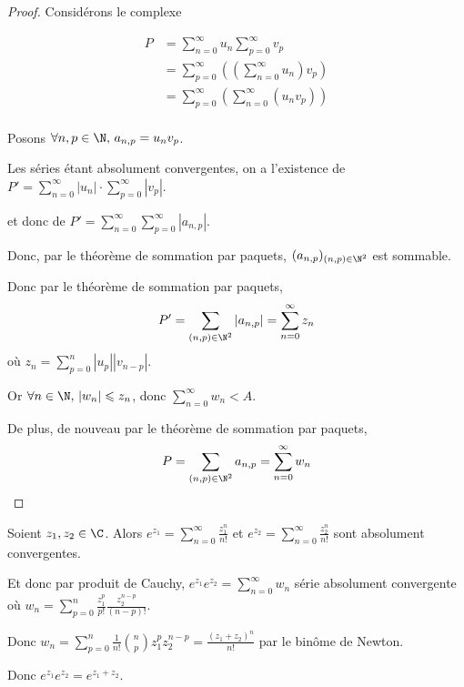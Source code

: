 
\begin{proof}
    Considérons le complexe 

    \begin{align*}
        P & = \sum_{n = 0 }^{\infty } u_n \sum_{p = 0 }^{\infty } v_p \\
            & = \sum_{p = 0 }^{\infty } \left( \left( \sum_{n = 0}^{\infty } u_n \right) v_p \right) \\
            & = \sum_{p = 0 }^{\infty } \left( \sum_{n = 0}^{\infty } (u_n v_p) \right) \\ 
    \end{align*}

    Posons $\forall n, p \in \N, \, a_{n, p} = u_n v_p$.

    Les séries étant absolument convergentes, on a l'existence de 
    $P' = \displaystyle \sum_{n = 0 }^{\infty } |u_n| \cdot \sum_{p = 0 }^{\infty } |v_p|$.

    et donc de $P' = \displaystyle \sum_{n = 0 }^{\infty } \sum_{p = 0 }^{\infty } |a_{n, p}|$.

    Donc, par le théorème de sommation par paquets, $(a_{n, p})_{(n, p) \in \N^2}$ est sommable. 

    Donc par le théorème de sommation par paquets, 
    $$P' = \sum_{(n, p) \in \N^2} |a_{n, p}| = \sum_{n = 0 }^{\infty } z_n$$
    où $\displaystyle z_n = \sum_{p = 0}^n |u_p| |v_{n - p}|$.

    Or $\forall n \in \N, \, |w_n| \leqslant z_n$, donc $\displaystyle \sum_{n = 0 }^{\infty } w_n < A$. 

    De plus, de nouveau par le théorème de sommation par paquets,
    $$P = \sum_{(n, p) \in \N^2} a_{n, p} = \sum_{n = 0 }^{\infty } w_n$$
\end{proof}

\begin{exemple}
    Soient $z_1, z_2 \in \C$. Alors 
    $\displaystyle e^{z_1} = \sum_{n = 0 }^{\infty } \frac{z_1^n}{n!}$ et
    $\displaystyle e^{z_2} = \sum_{n = 0 }^{\infty } \frac{z_2^n}{n!}$ sont absolument convergentes.

    Et donc par produit de Cauchy, $\displaystyle e^{z_1} e^{z_2} = \sum_{n = 0 }^{\infty } w_n$ 
    série absolument convergente où $\displaystyle w_n = \sum_{ p = 0}^n \frac{z_1^p}{p!} \frac{z_2^{n - p}}{(n - p)!}$.

    Donc $w_n = \displaystyle \sum_{p = 0 }^{n } \frac{1}{n!} \binom n p z_1^p z_2^{n - p} = \frac{(z_1 + z_2)^n}{n!}$ 
    par le binôme de Newton.

    Donc $\displaystyle e^{z_1} e^{z_2} = e^{z_1 + z_2}$.

\end{exemple}

